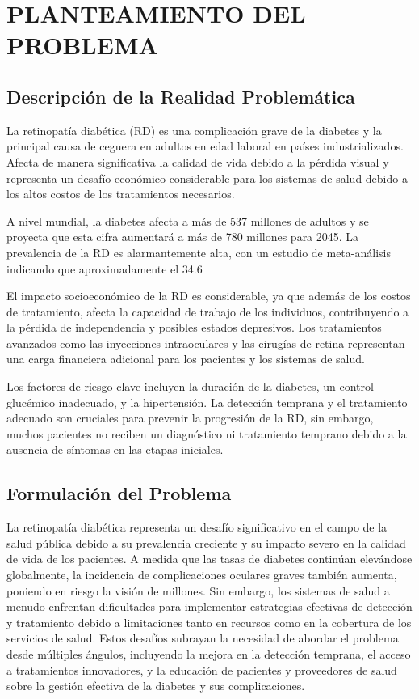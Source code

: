 \chapter{PLANTEAMIENTO DEL PROBLEMA}
\section{Descripción de la Realidad Problemática}

La retinopatía diabética (RD) es una complicación grave de la diabetes y la principal causa de ceguera en adultos en edad laboral en países industrializados. Afecta de manera significativa la calidad de vida debido a la pérdida visual y representa un desafío económico considerable para los sistemas de salud debido a los altos costos de los tratamientos necesarios.

A nivel mundial, la diabetes afecta a más de 537 millones de adultos y se proyecta que esta cifra aumentará a más de 780 millones para 2045. La prevalencia de la RD es alarmantemente alta, con un estudio de meta-análisis indicando que aproximadamente el 34.6%

El impacto socioeconómico de la RD es considerable, ya que además de los costos de tratamiento, afecta la capacidad de trabajo de los individuos, contribuyendo a la pérdida de independencia y posibles estados depresivos. Los tratamientos avanzados como las inyecciones intraoculares y las cirugías de retina representan una carga financiera adicional para los pacientes y los sistemas de salud.

Los factores de riesgo clave incluyen la duración de la diabetes, un control glucémico inadecuado, y la hipertensión. La detección temprana y el tratamiento adecuado son cruciales para prevenir la progresión de la RD, sin embargo, muchos pacientes no reciben un diagnóstico ni tratamiento temprano debido a la ausencia de síntomas en las etapas iniciales.
\section{Formulación del Problema}

La retinopatía diabética representa un desafío significativo en el campo de la salud pública debido a su prevalencia creciente y su impacto severo en la calidad de vida de los pacientes. A medida que las tasas de diabetes continúan elevándose globalmente, la incidencia de complicaciones oculares graves también aumenta, poniendo en riesgo la visión de millones. Sin embargo, los sistemas de salud a menudo enfrentan dificultades para implementar estrategias efectivas de detección y tratamiento debido a limitaciones tanto en recursos como en la cobertura de los servicios de salud. Estos desafíos subrayan la necesidad de abordar el problema desde múltiples ángulos, incluyendo la mejora en la detección temprana, el acceso a tratamientos innovadores, y la educación de pacientes y proveedores de salud sobre la gestión efectiva de la diabetes y sus complicaciones.

